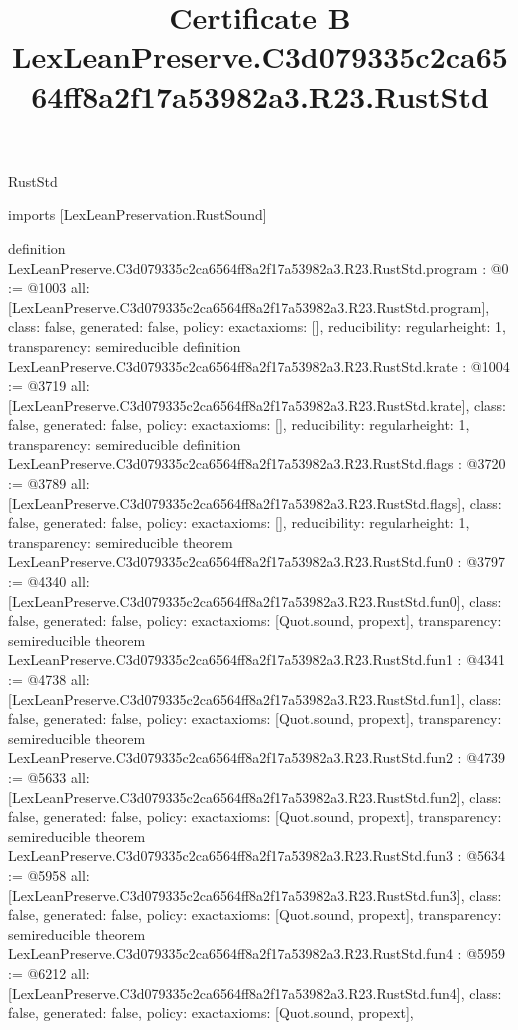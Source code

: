 \begin{lexlean}{RustStd}
\title{Certificate B LexLeanPreserve.C3d079335c2ca6564ff8a2f17a53982a3.R23.RustStd}
\begin{coremodule}
imports [LexLeanPreservation.RustSound]

definition LexLeanPreserve.C3d079335c2ca6564ff8a2f17a53982a3.R23.RustStd.program : @0 := @1003 {
  all: [LexLeanPreserve.C3d079335c2ca6564ff8a2f17a53982a3.R23.RustStd.program],
  class: false,
  generated: false,
  policy: exact{axioms: []},
  reducibility: regular{height: 1},
  transparency: semireducible
}
definition LexLeanPreserve.C3d079335c2ca6564ff8a2f17a53982a3.R23.RustStd.krate : @1004 := @3719 {
  all: [LexLeanPreserve.C3d079335c2ca6564ff8a2f17a53982a3.R23.RustStd.krate],
  class: false,
  generated: false,
  policy: exact{axioms: []},
  reducibility: regular{height: 1},
  transparency: semireducible
}
definition LexLeanPreserve.C3d079335c2ca6564ff8a2f17a53982a3.R23.RustStd.flags : @3720 := @3789 {
  all: [LexLeanPreserve.C3d079335c2ca6564ff8a2f17a53982a3.R23.RustStd.flags],
  class: false,
  generated: false,
  policy: exact{axioms: []},
  reducibility: regular{height: 1},
  transparency: semireducible
}
theorem LexLeanPreserve.C3d079335c2ca6564ff8a2f17a53982a3.R23.RustStd.fun0 : @3797 := @4340 {
  all: [LexLeanPreserve.C3d079335c2ca6564ff8a2f17a53982a3.R23.RustStd.fun0],
  class: false,
  generated: false,
  policy: exact{axioms: [Quot.sound, propext]},
  transparency: semireducible
}
theorem LexLeanPreserve.C3d079335c2ca6564ff8a2f17a53982a3.R23.RustStd.fun1 : @4341 := @4738 {
  all: [LexLeanPreserve.C3d079335c2ca6564ff8a2f17a53982a3.R23.RustStd.fun1],
  class: false,
  generated: false,
  policy: exact{axioms: [Quot.sound, propext]},
  transparency: semireducible
}
theorem LexLeanPreserve.C3d079335c2ca6564ff8a2f17a53982a3.R23.RustStd.fun2 : @4739 := @5633 {
  all: [LexLeanPreserve.C3d079335c2ca6564ff8a2f17a53982a3.R23.RustStd.fun2],
  class: false,
  generated: false,
  policy: exact{axioms: [Quot.sound, propext]},
  transparency: semireducible
}
theorem LexLeanPreserve.C3d079335c2ca6564ff8a2f17a53982a3.R23.RustStd.fun3 : @5634 := @5958 {
  all: [LexLeanPreserve.C3d079335c2ca6564ff8a2f17a53982a3.R23.RustStd.fun3],
  class: false,
  generated: false,
  policy: exact{axioms: [Quot.sound, propext]},
  transparency: semireducible
}
theorem LexLeanPreserve.C3d079335c2ca6564ff8a2f17a53982a3.R23.RustStd.fun4 : @5959 := @6212 {
  all: [LexLeanPreserve.C3d079335c2ca6564ff8a2f17a53982a3.R23.RustStd.fun4],
  class: false,
  generated: false,
  policy: exact{axioms: [Quot.sound, propext]},
}
\end{coremodule}
\end{lexlean}
